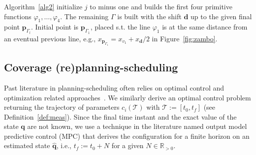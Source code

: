 \documentclass[letterpaper,10pt,journal,twoside]{IEEEtran}
\theoremstyle{definition}
\begin{document}
Algorithm~\ref{alg2} initialize $j$ to minus one and builds the first four primitive functions $\varphi_1,\dots,\varphi_4$. The remaining $\Gamma$ is built with the shift $\mathbf{d}$ up to the given final point $\mathbf{p}_{\Gamma_l}$. Initial point is $\mathbf{p}_{\Gamma_1}$, placed s.t. the line $\varphi_1$ is at the same distance from an eventual previous line, e.g., $x_{\mathbf{p}_{\Gamma_1}}=x_{v_1}+x_{\mathbf{d}}/2$ in Figure~\ref{fig:zambo}.

\subsection{Coverage (re)planning-scheduling}
\label{sec:repla-algo}

Past literature in planning-scheduling often relies on optimal control and optimization related approaches~\cite{brateman2006energy,zhang2007low,ondruska2015scheduled,lahijanian2018resource}. We similarly derive an optimal control problem returning the trajectory of parameters $c_i(\mathcal{T})$ with $\mathcal{T}:=[t_0,t_f]$ (see Definition~\ref{def:meas}). Since the final time instant and the exact value of the state $\mathbf{q}$ are not known, we use a technique in the literature named output model predictive control (MPC) that derives the configuration for a finite horizon on an estimated state $\hat{\mathbf{q}}$, i.e., $t_f:=t_0+N$ for a given $N\in\mathbb{R}_{>0}$.
\end{document}
